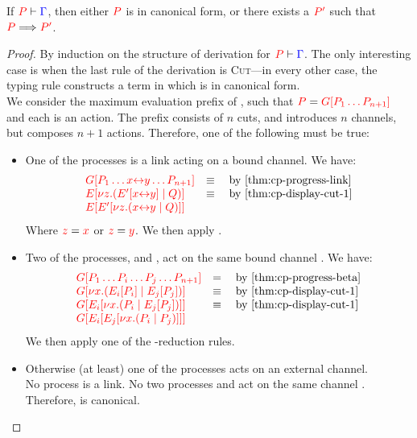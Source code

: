 \begin{theorem}[Progress]\label{thm:cp-progress-3}
  If $\seq[{ P }]{ \Gamma }$, then either $\tm{P}$ is in canonical form, or
  there exists a $\tm{P'}$ such that $\reducesto{P}{P'}$. 
\end{theorem}
\begin{proof}
  By induction on the structure of derivation for $\seq[{ P }]{ \Gamma }$.
  The only interesting case is when the last rule of the derivation is
  \textsc{Cut}---in every other case, the typing rule constructs a term in which 
  is in canonical form. 
  \\
  We consider the maximum evaluation prefix  of , such that $\tm{P}
  = \tm{\cpPlug{G}{P_1 \dots P_{n+1}}}$ and each  is an action.
  The prefix  consists of $n$ cuts, and introduces $n$ channels, but
  composes $n+1$ actions. Therefore, one of the following must be true:
  \begin{itemize}
  \item
    One of the processes is a link  acting on a bound channel.
    We have:
    \begin{gather*}
      \begin{array}{ll}
        \tm{\cpPlug{G}{P_1 \dots \cpLink{x}{y} \dots P_{n+1}}}
        & \equiv \quad \text{by \cref{thm:cp-progress-link}}
        \\
        \tm{\cpPlug{E}{\cpCut{z}{\cpPlug{E'}{\cpLink{x}{y}}}{Q}}}
        & \equiv \quad \text{by \cref{thm:cp-display-cut-1}}
        \\
        \tm{\cpPlug{E}{\cpPlug{E'}{\cpCut{z}{\cpLink{x}{y}}{Q}}}}
      \end{array}
    \end{gather*}
    Where $\tm{z} = \tm{x}$ or $\tm{z} = \tm{y}$.
    We then apply .
  \item
    Two of the processes,  and , act on the same bound channel
    . We have:
    \begin{gather*}
      \begin{array}{ll}
        \tm{\cpPlug{G}{P_1 \dots P_i \dots P_j \dots P_{n+1}}}
        & = \quad \text{by \cref{thm:cp-progress-beta}}
        \\
        \tm{\cpPlug{G}{\cpCut{x}{\cpPlug{E_i}{P_i}}{\cpPlug{E_j}{P_j}}}}
        & \equiv \quad \text{by \cref{thm:cp-display-cut-1}} 
        \\
        \tm{\cpPlug{G}{\cpPlug{E_i}{\cpCut{x}{P_i}{\cpPlug{E_j}{P_j}}}}}
        & \equiv \quad \text{by \cref{thm:cp-display-cut-1}} 
        \\
        \tm{\cpPlug{G}{\cpPlug{E_i}{\cpPlug{E_j}{\cpCut{x}{P_i}{P_j}}}}} 
      \end{array}
    \end{gather*}
    We then apply one of the \textbeta-reduction rules.
  \item
    Otherwise (at least) one of the processes acts on an external channel.
    \\
    No process  is a link.
    No two processes  and  act on the same channel .
    Therefore,  is canonical.
  \end{itemize}
\end{proof}
